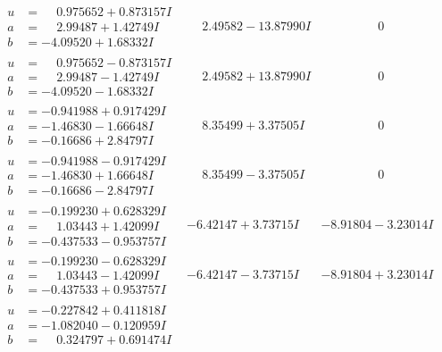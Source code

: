 \documentclass[1p]{elsarticle_modified}
\theoremstyle{definition}
\begin{document}
$$\begin{array}{c|c|c}
\begin{aligned}
u &= \phantom{-}0.975652 + 0.873157 I \\
a &= \phantom{-}2.99487 + 1.42749 I \\
b &= -4.09520 + 1.68332 I\end{aligned}
 & \phantom{-}2.49582 - 13.87990 I & \phantom{-0.000000 } 0 \\ \hline\begin{aligned}
u &= \phantom{-}0.975652 - 0.873157 I \\
a &= \phantom{-}2.99487 - 1.42749 I \\
b &= -4.09520 - 1.68332 I\end{aligned}
 & \phantom{-}2.49582 + 13.87990 I & \phantom{-0.000000 } 0 \\ \hline\begin{aligned}
u &= -0.941988 + 0.917429 I \\
a &= -1.46830 - 1.66648 I \\
b &= -0.16686 + 2.84797 I\end{aligned}
 & \phantom{-}8.35499 + 3.37505 I & \phantom{-0.000000 } 0 \\ \hline\begin{aligned}
u &= -0.941988 - 0.917429 I \\
a &= -1.46830 + 1.66648 I \\
b &= -0.16686 - 2.84797 I\end{aligned}
 & \phantom{-}8.35499 - 3.37505 I & \phantom{-0.000000 } 0 \\ \hline\begin{aligned}
u &= -0.199230 + 0.628329 I \\
a &= \phantom{-}1.03443 + 1.42099 I \\
b &= -0.437533 - 0.953757 I\end{aligned}
 & -6.42147 + 3.73715 I & -8.91804 - 3.23014 I \\ \hline\begin{aligned}
u &= -0.199230 - 0.628329 I \\
a &= \phantom{-}1.03443 - 1.42099 I \\
b &= -0.437533 + 0.953757 I\end{aligned}
 & -6.42147 - 3.73715 I & -8.91804 + 3.23014 I \\ \hline\begin{aligned}
u &= -0.227842 + 0.411818 I \\
a &= -1.082040 - 0.120959 I \\
b &= \phantom{-}0.324797 + 0.691474 I\end{aligned}

\end{array}$$
\end{document}
